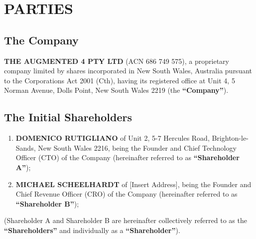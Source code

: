 \section{PARTIES}

\subsection{The Company}
\textbf{THE AUGMENTED 4 PTY LTD} (ACN 686 749 575), a proprietary company limited by shares incorporated in New South Wales, Australia pursuant to the Corporations Act 2001 (Cth), having its registered office at Unit 4, 5 Norman Avenue, Dolls Point, New South Wales 2219 (the \textbf{``Company''}).

\subsection{The Initial Shareholders}
\begin{enumerate}[label=(\arabic*)]
\item \textbf{DOMENICO RUTIGLIANO} of Unit 2, 5-7 Hercules Road, Brighton-le-Sands, New South Wales 2216, being the Founder and Chief Technology Officer (CTO) of the Company (hereinafter referred to as \textbf{``Shareholder A''});
\item \textbf{MICHAEL SCHEELHARDT} of [Insert Address], being the Founder and Chief Revenue Officer (CRO) of the Company (hereinafter referred to as \textbf{``Shareholder B''});
\end{enumerate}

(Shareholder A and Shareholder B are hereinafter collectively referred to as the \textbf{``Shareholders''} and individually as a \textbf{``Shareholder''}). 